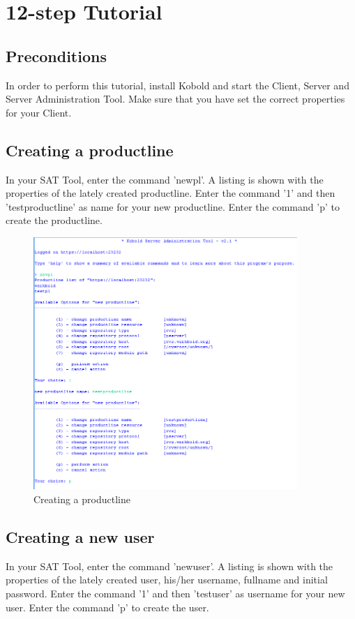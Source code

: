 \chapter{12-step Tutorial}

\section{Preconditions}
In order to perform this tutorial, install Kobold and start the Client, Server and
Server Administration Tool. Make sure that you have set the correct properties for your
Client. 


\section{Creating a productline}
In your SAT Tool, enter the command 'newpl'. A listing is shown with the properties of the lately created
productline. Enter the command '1' and then 'testproductline' as name for your
new productline. Enter the command 'p' to create the productline.

\begin{figure}[h!]
\begin{center}
\includegraphics[width=10cm]{tutorial1.png}
   \caption{Creating a productline}
\end{center}
\end{figure}\par


\section{Creating a new user}
In your SAT Tool, enter the command 'newuser'. A listing is shown with the properties of the lately created
user, his/her username, fullname and initial password. 
Enter the command '1' and then 'testuser' as username for your new user.
Enter the command 'p' to create the user.

